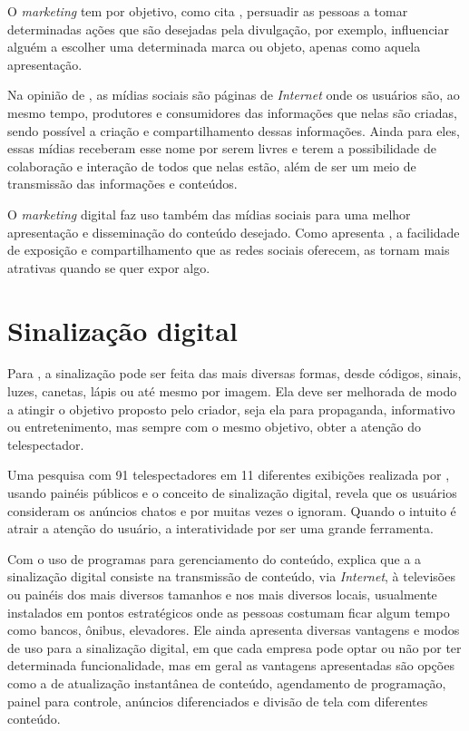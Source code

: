 O \textit{marketing} tem por objetivo, como cita \citet{ryan2016}, persuadir as pessoas a tomar determinadas ações que são desejadas pela divulgação, por exemplo, influenciar alguém a escolher uma determinada marca ou objeto, apenas como aquela apresentação.

Na opinião de \citet{torres2000}, as mídias sociais são páginas de \textit{Internet} onde os usuários são, ao mesmo tempo, produtores e consumidores das informações que nelas são criadas, sendo possível a criação e compartilhamento dessas informações. Ainda para eles, essas mídias receberam esse nome por serem livres e terem a possibilidade de
colaboração e interação de todos que nelas estão, além de ser um meio de transmissão das informações e conteúdos.

O \textit{marketing} digital faz uso também das mídias sociais para uma melhor apresentação e disseminação do conteúdo desejado. Como apresenta \citet{torres2000}, a facilidade de exposição e compartilhamento que as redes sociais oferecem, as tornam mais atrativas quando se quer expor algo.

\section{Sinalização digital}
Para \citet{munari2006}, a sinalização pode ser feita das mais diversas formas, desde códigos, sinais, luzes, canetas, lápis ou até mesmo por imagem. Ela deve ser melhorada de modo a atingir o objetivo proposto pelo criador, seja ela para propaganda, informativo ou entretenimento, mas sempre com o mesmo objetivo, obter a atenção do telespectador.

Uma pesquisa com 91 telespectadores em 11 diferentes exibições realizada por \citet{muller2009}, usando painéis públicos e o conceito de sinalização digital, revela que os usuários consideram os anúncios chatos e por muitas vezes o ignoram. Quando o intuito é atrair a atenção do usuário, a interatividade por ser uma grande ferramenta.

Com o uso de programas para gerenciamento do conteúdo, \citet[p.31]{machado2010} explica que a a sinalização digital consiste na transmissão de conteúdo, via \textit{Internet}, à televisões ou painéis dos mais diversos tamanhos e nos mais diversos locais, usualmente instalados em pontos estratégicos onde as pessoas costumam ficar algum tempo como bancos, ônibus, elevadores. Ele ainda apresenta diversas vantagens e modos de uso para a sinalização digital, em que cada empresa pode optar ou não por ter determinada funcionalidade, mas em geral as vantagens apresentadas são opções como a de atualização instantânea de conteúdo, agendamento de programação, painel para controle, anúncios diferenciados e divisão de tela com diferentes conteúdo.

